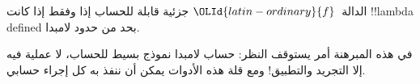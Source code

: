 \documentclass[../../../include/open-logic-section]{subfiles}
\begin{document}
\begin{thm}
الدالة~${\OLId{latin-ordinary}{f}}$ جزئية قابلة للحساب إذا وفقط إذا كانت
!!{lambda defined} بحد من حدود لامبدا.
\end{thm}

\begin{explain}
في هذه المبرهنة أمر يستوقف النظر: حساب لامبدا نموذج بسيط
للحساب، لا عملية فيه إلا التجريد والتطبيق!{}
ومع قلة هذه الأدوات يمكن أن ننفذ به كل إجراء حسابي.
\end{explain}
\end{document}
